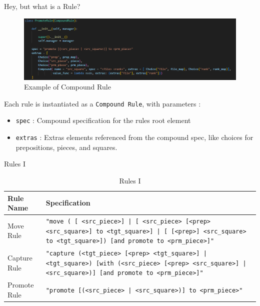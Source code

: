 \documentclass[english]{beamer}
\begin{document}
\begin{frame}{Hey, but what is a Rule?}
    \begin{figure}
        \centering
        \includegraphics[width=\textwidth]{images/compound_rule.png}
        \caption{Example of Compound Rule}
    \end{figure}
    Each rule is instantiated as a \texttt{Compound Rule}, with parameters : 
    \begin{itemize}
        \item \texttt{spec} : Compound specification for the rules root element 
        \item \texttt{extras} :  Extras elements referenced from the compound spec, like choices for prepositions, pieces, and squares.
    \end{itemize}
\end{frame}

\begin{frame}{Rules I}
    \begin{table}[h]
        \centering
        \caption{Rules I}
        \small %
        \begin{tabularx}{1.0\textwidth}{|l|X|} %
            \hline
            \textbf{Rule Name} & \textbf{Specification} \\
            \hline
            Move Rule & \texttt{"move ( [ <src\_piece>] | [ <src\_piece> [<prep> <src\_square>] to <tgt\_square>] | [ [<prep>] <src\_square> to <tgt\_square>]) [and promote to <prm\_piece>]"} \\
            \hline
            Capture Rule & \texttt{"capture (<tgt\_piece> [<prep> <tgt\_square>] | <tgt\_square>) [with (<src\_piece> [<prep> <src\_square>] | <src\_square>)] [and promote to <prm\_piece>]"}\\
            \hline
            Promote Rule & \texttt{"promote [(<src\_piece> | <src\_square>)] to <prm\_piece>"} \\
            \hline 
        \end{tabularx}
    \end{table}
\end{frame}
\end{document}

